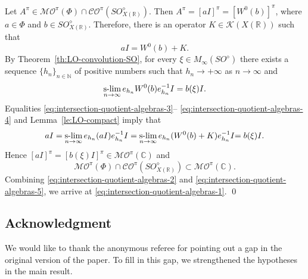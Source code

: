 \documentclass{birkjour}
\numberwithin{equation}{section}
\newcommand{\C}{\mathbb{C}}
\newcommand{\N}{\mathbb{N}}
\newcommand{\R}{\mathbb{R}}
\newcommand{\cK}{\mathcal{K}}
\newcommand{\slim}{\operatornamewithlimits{s-\!\lim}_{n\to\infty}}
\begin{document}
Let $A^\pi\in \mathcal{MO}^\pi(\Phi)\cap
\mathcal{CO}^\pi{(SO_{X(\R)}^\diamond)}$. Then
$A^\pi=[aI]^\pi=[W^0(b)]^\pi$, where $a\in\Phi$
{and $b\in SO_{X(\R)}^\diamond$}.
Therefore, there is an operator $K\in\cK(X(\R))$ such that
\begin{equation}\label{eq:intersection-quotient-algebras-3}
aI=W^0(b)+K.
\end{equation}
By Theorem~\ref{th:LO-convolution-SO}, for every $\xi\in M_\infty(SO^\diamond)$
there exists a sequence $\{h_n\}_{n\in\N}$ of positive numbers such that
$h_n\to+\infty$ as $n\to\infty$ and
\begin{equation}\label{eq:intersection-quotient-algebras-4}
\slim e_{h_n}W^0({b})e_{h_n}^{-1}I={b}(\xi)I.
\end{equation}
Equalities \eqref{eq:intersection-quotient-algebras-3}--%
\eqref{eq:intersection-quotient-algebras-4} and Lemma~\ref{le:LO-compact}
imply that
\[
aI
=
\slim e_{h_n}(aI)e_{h_n}^{-1}I
=
\slim e_{h_n}(W^0(b)+K)e_{h_n}^{-1}I
{=b(\xi)I.}
\]
Hence $[aI]^\pi=[{b}(\xi)I]^\pi\in\mathcal{MO}^\pi(\C)$ and
\begin{equation}\label{eq:intersection-quotient-algebras-5}
\mathcal{MO}^\pi(\Phi)
\cap
\mathcal{CO}^\pi
{(SO_{X(\R)}^\diamond)}
\subset\mathcal{MO}^\pi(\C).
\end{equation}
Combining \eqref{eq:intersection-quotient-algebras-2} and
\eqref{eq:intersection-quotient-algebras-5}, we arrive at
\eqref{eq:intersection-quotient-algebras-1}.
\qed
{
\subsection*{Acknowledgment}
We would like to thank the anonymous referee for pointing out a gap
in the original version of the paper. To fill in this gap, we 
strengthened the hypotheses in the main result.
}
\end{document}
